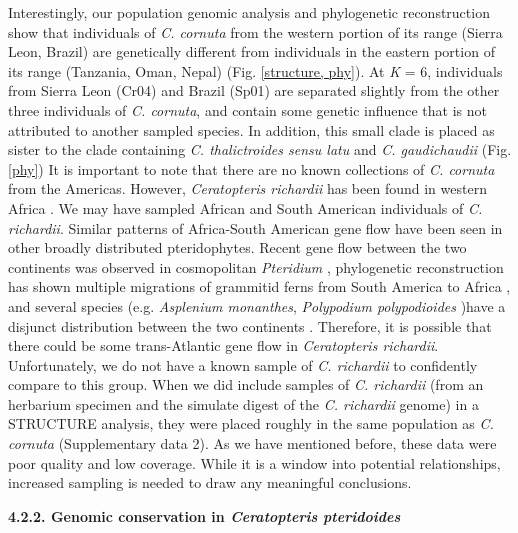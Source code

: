 \documentclass[12pt]{article}
\begin{document}
\begin{flushleft}
Interestingly, our population genomic analysis and phylogenetic reconstruction show that individuals of \textit{C. cornuta} from the western portion of its range (Sierra Leon, Brazil) are genetically different from individuals in the eastern portion of its range (Tanzania, Oman, Nepal) (Fig. \ref{structure, phy}). At \textit{K} = 6, individuals from Sierra Leon (Cr04) and Brazil (Sp01) are separated slightly from the other three individuals of \textit{C. cornuta}, and contain some genetic influence that is not attributed to another sampled species. In addition, this small clade is placed as sister to the clade containing \textit{C. thalictroides sensu latu} and \textit{C. gaudichaudii} (Fig. \ref{phy}) It is important to note that there are no known collections of \textit{C. cornuta} from the Americas. However, \textit{Ceratopteris richardii} has been found in western Africa \cite{LloydTax1974}. We may have sampled African and South American individuals of \textit{C. richardii}. Similar patterns of Africa-South American gene flow have been seen in other broadly distributed pteridophytes. Recent gene flow between the two continents was observed in cosmopolitan \textit{Pteridium} \autocite{Wolf2019}, phylogenetic reconstruction has shown multiple migrations of grammitid ferns from South America to Africa \autocite{Sundue2014}, and several species (e.g. \textit{Asplenium monanthes}, \textit{Polypodium polypodioides} )have a disjunct distribution between the two continents \cite{kornas1993}. Therefore, it is possible that there could be some trans-Atlantic gene flow in \textit{Ceratopteris richardii}. Unfortunately, we do not have a known sample of \textit{C. richardii} to confidently compare to this group. When we did include samples of \textit{C. richardii} (from an herbarium specimen and the simulate digest of the \textit{C. richardii} genome) in a {\small{STRUCTURE}} analysis, they were placed roughly in the same population as \textit{C. cornuta} (Supplementary data 2). As we have mentioned before, these data were poor quality and low coverage. While it is a window into potential relationships, increased sampling is needed to draw any meaningful conclusions. 

\textbf{4.2.2. Genomic conservation in \textit{Ceratopteris pteridoides}}


\end{flushleft}
\end{document}
